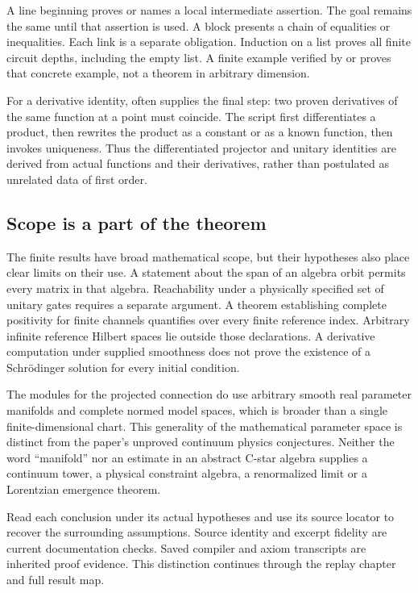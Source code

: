 A line beginning  proves or names a local intermediate assertion. The goal remains the same until that assertion is used. A  block presents a chain of equalities or inequalities. Each link is a separate obligation. Induction on a list proves all finite circuit depths, including the empty list. A finite example verified by  or  proves that concrete example, not a theorem in arbitrary dimension.

For a derivative identity,  often supplies the final step: two proven derivatives of the same function at a point must coincide. The script first differentiates a product, then rewrites the product as a constant or as a known function, then invokes uniqueness. Thus the differentiated projector and unitary identities are derived from actual functions and their derivatives, rather than postulated as unrelated data of first order.

\subsection{Scope is a part of the theorem}
The finite results have broad mathematical scope, but their hypotheses also place clear limits on their use. A statement about the span of an algebra orbit permits every matrix in that algebra. Reachability under a physically specified set of unitary gates requires a separate argument. A theorem establishing complete positivity for finite channels quantifies over every finite reference index. Arbitrary infinite reference Hilbert spaces lie outside those declarations. A derivative computation under supplied smoothness does not prove the existence of a Schrödinger solution for every initial condition.

The modules for the projected connection do use arbitrary smooth real parameter manifolds and complete normed model spaces, which is broader than a single finite-dimensional chart. This generality of the mathematical parameter space is distinct from the paper's unproved continuum physics conjectures. Neither the word ``manifold'' nor an estimate in an abstract C-star algebra supplies a continuum tower, a physical constraint algebra, a renormalized limit or a Lorentzian emergence theorem.

Read each conclusion under its actual hypotheses and use its source locator to recover the surrounding assumptions. Source identity and excerpt fidelity are current documentation checks. Saved compiler and axiom transcripts are inherited proof evidence. This distinction continues through the replay chapter and full result map.

